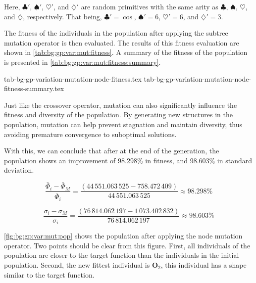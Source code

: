   Here, \(\clubsuit'\), \(\spadesuit'\), \(\heartsuit'\), and \(\diamondsuit'\)
  are random primitives with the same arity as \(\clubsuit\), \(\spadesuit\),
  \(\heartsuit\), and \(\diamondsuit\), respectively.
  That being, \(\clubsuit' = \cos\), \(\spadesuit' = 6\), \(\heartsuit' = 6\),
  and \(\diamondsuit' = 3\).

  The fitness of the individuals in the population after applying the subtree 
  mutation operator is then evaluated.
  The results of this fitness evaluation are shown in 
  \vref{tab:bg:gp:var:mut:fitness}.
  A summary of the fitness of the population is presented in 
  \vref{tab:bg:gp:var:mut:fitness:summary}.

  {tab-bg-gp-variation-mutation-node-fitness.tex}
  {tab-bg-gp-variation-mutation-node-fitness-summary.tex}


  Just like the crossover operator, mutation can also significantly influence 
  the fitness and diversity of the population.
  By generating new structures in the population, mutation can help prevent
  stagnation and maintain diversity, thus avoiding premature convergence to
  suboptimal solutions.

  With this, we can conclude that after at the end of the generation, the
  population shows an improvement of 98.298\% in fitness, and 98.603\% in
  standard deviation.

  \[
    \frac{\bar{\Phi}_i - \bar{\Phi}_M}{\bar{\Phi}_i}
      = \frac{(44\,551.063\,525 - 758.472\,409)}{44\,551.063\,525} 
      \approx 98.298\%
  \]

  \[
    \frac{\sigma_i - \sigma_M}{\sigma_i}
      = \frac{(76\,814.062\,197 - 1\,073.402\,832)}{76\,814.062\,197}
      \approx 98.603\%
  \]

  \vref{fig:bg:gp:var:mut:pop} shows the population after applying the node
  mutation operator.
  Two points should be clear from this figure.
  First, all individuals of the population are closer to the target function
  than the individuals in the initial population.
  Second, the new fittest individual is \(\mathbf{O}_2\), this individual has a
  shape similar to the target function.

